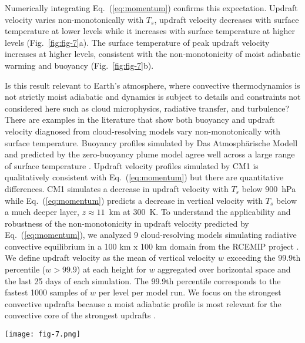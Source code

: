 \documentclass[]{ametsocV6.1}
\begin{document}
Numerically integrating Eq.~(\ref{eq:momentum}) confirms this expectation. Updraft velocity varies non-monotonically with $T_s$, updraft velocity decreases with surface temperature at lower levels while it increases with surface temperature at higher levels (Fig.~\ref{fig:fig-7}a). The surface temperature of peak updraft velocity increases at higher levels, consistent with the non-monotonicity of moist adiabatic warming and buoyancy (Fig.~\ref{fig:fig-7}b).

Is this result relevant to Earth's atmosphere, where convective thermodynamics is not strictly moist adiabatic and dynamics is subject to details and constraints not considered here such as cloud microphysics, radiative transfer, and turbulence? There are examples in the literature that show both buoyancy and updraft velocity diagnosed from cloud-resolving models vary non-monotonically with surface temperature. Buoyancy profiles simulated by Das Atmosph\"arische Modell and predicted by the zero-buoyancy plume model agree well across a large range of surface temperature \citep[Fig.~2a in][]{seeley2015a}. Updraft velocity profiles simulated by CM1 \cite[Fig.~2 in][]{singh2015} is qualitatively consistent with Eq.~(\ref{eq:momentum}) but there are quantitative differences. CM1 simulates a decrease in updraft velocity with $T_s$ below 900~hPa while Eq.~(\ref{eq:momentum}) predicts a decrease in vertical velocity with $T_s$ below a much deeper layer, $z\approx11$~km at 300~K. To understand the applicability and robustness of the non-monotonicity in updraft velocity predicted by Eq.~(\ref{eq:momentum}), we analyzed 9 cloud-resolving models simulating radiative convective equilibrium in a 100 km x 100 km domain from the RCEMIP project \citep{wing2018}. We define updraft velocity as the mean of vertical velocity $w$ exceeding the 99.9th percentile ($w>{99.9}$) at each height for $w$ aggregated over horizontal space and the last 25 days of each simulation. The 99.9th percentile corresponds to the fastest 1000 samples of $w$ per level per model run. We focus on the strongest convective updrafts because a moist adiabatic profile is most relevant for the convective core of the strongest updrafts \citep{riehl1958}.

\begin{figure*}[htbp]
 \centering
 \texttt{[image: fig-7.png]}\\
 \caption{(a) Vertical profiles of updraft velocity, calculated by numerically integrating Eq.~(\ref{eq:momentum}) in height using buoyancy $B$ from Eq.~(\ref{eq:buoyancy_def}). Updraft velocity decreases with surface temperature at lower levels while it increases with surface temperature at higher levels. (b) Updraft velocity varies non-monotonically with surface temperature at all levels, e.g. at 5, 10, 15, and 20~km. Updraft velocity peaks at warmer surface temperatures at higher levels consistent with the behavior of buoyancy (Fig.~\ref{fig:fig-6}a) and moist adiabatic warming (Fig.~\ref{fig:fig-5}).}\label{fig:fig-7}
\end{figure*}
\end{document}
